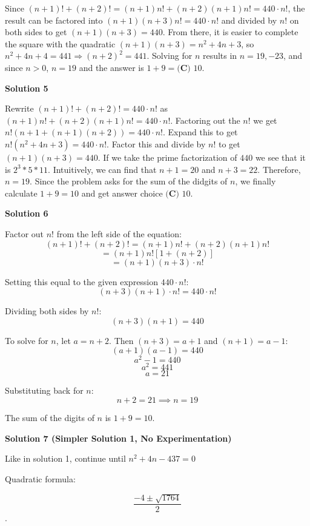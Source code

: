 \begin{enumerate}
Since $(n+1)! + (n+2)! = (n+1)n! + (n+2)(n+1)n! = 440 \cdot n!$, the result can be factored into $(n+1)(n+3)n!=440 \cdot n!$ and divided by $n!$ on both sides to get $(n+1)(n+3)=440$. From there, it is easier to complete the square with the quadratic $(n+1)(n+3) = n^2 + 4n + 3$, so $n^2+4n+4=441 \Rightarrow (n+2)^2=441$. Solving for $n$ results in $n=19,-23$, and since $n>0$, $n=19$ and the answer is $1 + 9 = \boxed{\textbf{(C) }10}$.

 



\textbf{Solution 5}

Rewrite $(n+1)! + (n+2)! = 440 \cdot n!$ as $(n+1)n! + (n+2)(n+1)n! = 440 \cdot n!.$ Factoring out the $n!$ we get $n!(n + 1 + (n+1)(n+2)) = 440 \cdot n!.$ Expand this to get $n!(n^2 + 4n + 3) = 440 \cdot n!.$ Factor this and divide by $n!$ to get $(n + 1)(n + 3) = 440.$ If we take the prime factorization of $440$ we see that it is $2^3 * 5 * 11.$ Intuitively, we can find that $n + 1 = 20$ and $n + 3 = 22.$ Therefore, $n = 19.$ Since the problem asks for the sum of the didgits of $n$, we finally calculate $1 + 9 = 10$ and get answer choice $\boxed{\textbf{(C) }10}$.

 



\textbf{Solution 6}

Factor out $n!$ from the left side of the equation:
 \[(n+1)! + (n+2)! = (n+1)n! + (n+2)(n+1)n!\]
 \[= (n+1)n! \left[ 1 + (n+2) \right]\]
 \[= (n+1)(n+3) \cdot n!\]

 Setting this equal to the given expression $440 \cdot n!$:
 \[(n+3)(n+1) \cdot n! = 440 \cdot n!\]

 Dividing both sides by $n!$:
 \[(n+3)(n+1) = 440\]

 To solve for $n$, let $a = n+2$. Then $(n+3) = a+1$ and $(n+1) = a-1$:
 \[(a+1)(a-1) = 440\]
 \[a^2 - 1 = 440\]
 \[a^2 = 441\]
 \[a = 21\]

 Substituting back for $n$:
 \[n+2 = 21 \implies n = 19\]

 The sum of the digits of $n$ is $1 + 9 = \boxed{10}$.

 



\textbf{Solution 7 (Simpler Solution 1, No Experimentation)}

Like in solution 1, continue until $n^2 + 4n - 437 = 0$

 Quadratic formula:

 
 \[\frac{-4 \pm \sqrt{1764}}{2}\].


\end{enumerate}
